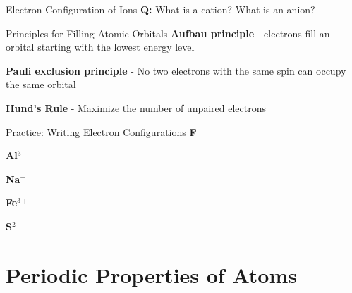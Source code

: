 \documentclass[11pt]{beamer}
\begin{document}
\begin{frame}{Electron Configuration of Ions}
  \textbf{Q:} What is a cation? What is an anion?


\end{frame}

\begin{frame}{Principles for Filling Atomic Orbitals}
  \textbf{Aufbau principle} - electrons fill an orbital starting with
  the lowest energy level
  
  \textbf{Pauli exclusion principle} - No two electrons with the same
  spin can occupy the same orbital

  \textbf{Hund's Rule} - Maximize the number of unpaired electrons
\end{frame}

\begin{frame}{Practice: Writing Electron Configurations}
  \textbf{F$^-$}
  \vspace{0.25in}

  \textbf{Al$^{3+}$}
  \vspace{0.25in}

  \textbf{Na$^+$}
  \vspace{0.25in}

  \textbf{Fe$^{3+}$}
  \vspace{0.25in}

  \textbf{S$^{2-}$}
\end{frame}

\section{Periodic Properties of Atoms}
\end{document}
